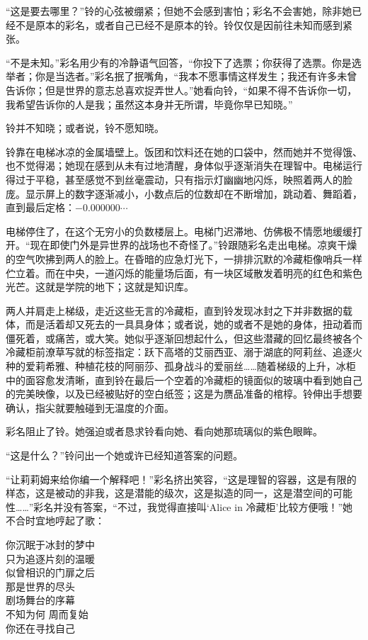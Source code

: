 “这是要去哪里？”铃的心弦被绷紧；但她不会感到害怕；彩名不会害她，除非她已经不是原本的彩名，或者自己已经不是原本的铃。铃仅仅是因前往未知而感到紧张。

“不是未知。”彩名用少有的冷静语气回答，“你投下了选票；你获得了选票。你是选举者；你是当选者。”彩名抿了抿嘴角，“我本不愿事情这样发生；我还有许多未曾告诉你；但是世界的意志总喜欢捉弄世人。”她看向铃，“如果不得不告诉你一切，我希望告诉你的人是我；虽然这本身并无所谓，毕竟你早已知晓。”

铃并不知晓；或者说，铃不愿知晓。

铃靠在电梯冰凉的金属墙壁上。饭团和饮料还在她的口袋中，然而她并不觉得饿、也不觉得渴；她现在感到从未有过地清醒，身体似乎逐渐消失在理智中。电梯运行得过于平稳，甚至感觉不到丝毫震动，只有指示灯幽幽地闪烁，映照着两人的脸庞。显示屏上的数字逐渐减小，小数点后的位数却在不断增加，跳动着、舞蹈着，直到最后定格：\(-0.000000\cdots\)

电梯停住了，在这个无穷小的负数楼层上。电梯门迟滞地、仿佛极不情愿地缓缓打开。“现在即使门外是异世界的战场也不奇怪了。”铃跟随彩名走出电梯。凉爽干燥的空气吹拂到两人的脸上。在昏暗的应急灯光下，一排排沉默的冷藏柜像哨兵一样伫立着。而在中央，一道闪烁的能量场后面，有一块区域散发着明亮的红色和紫色光芒。这就是学院的地下；这就是知识库。

两人并肩走上梯级，走近这些无言的冷藏柜，直到铃发现冰封之下并非数据的载体，而是活着却又死去的一具具身体；或者说，她的或者不是她的身体，扭动着而僵死着，或痛苦，或大笑。她似乎逐渐回想起什么，但这些潜藏的回忆最终被各个冷藏柜前潦草写就的标签指定：跃下高塔的艾丽西亚、溺于湖底的阿莉丝、追逐火种的爱莉希雅、种植花枝的阿丽莎、孤身战斗的爱丽丝……随着梯级的上升，冰柜中的面容愈发清晰，直到铃在最后一个空着的冷藏柜的镜面似的玻璃中看到她自己的完美映像，以及已经被贴好的空白纸签；这是为赝品准备的棺椁。铃伸出手想要确认，指尖就要触碰到无温度的介面。

彩名阻止了铃。她强迫或者恳求铃看向她、看向她那琉璃似的紫色眼眸。

“这是什么？”铃问出一个她或许已经知道答案的问题。

“让莉莉姆来给你编一个解释吧！”彩名挤出笑容，“这是理智的容器，这是有限的样态，这是被动的非我，这是潜能的级次，这是拟造的同一，这是潜空间的可能性……”彩名并没有答案，“不过，我觉得直接叫‘Alice in 冷藏柜’比较方便哦！”她不合时宜地哼起了歌：
\begin{song}
你沉眠于冰封的梦中\\
只为追逐片刻的温暖\\
似曾相识的门扉之后\\
那是世界的尽头\\
剧场舞台的序幕\\
不知为何 周而复始\\
你还在寻找自己
\end{song}

